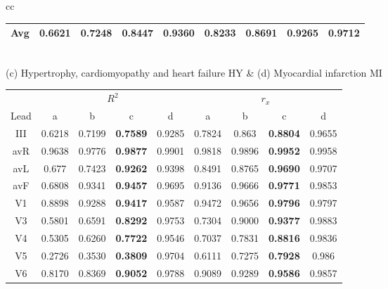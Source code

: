 \begin{table}[t!]
\begin{center}
\begin{tabular}{cc}
{\begin{footnotesize}
\begin{tabular}{|c|cccc|cccc|}
Avg & 0.6621 & 0.7248 & \textbf{0.8447} & 0.9360 & 0.8233  & 0.8691 & \textbf{0.9265} & 0.9712 \\

\hline
\end{tabular}
\end{footnotesize}
}
\\
(c) Hypertrophy, cardiomyopathy and heart failure HY & (d) Myocardial infarction MI \\
{
\begin{footnotesize}
\begin{tabular}{|c|cccc|cccc|}
\hline

\cline{2-9}
& \multicolumn{4}{c|}{$R^2$}
& \multicolumn{4}{c|}{$r_x$} \\
\cline{2-9}

Lead & a & b & c & d & a & b & c & d \\
\hline
III & 0.6218 & 0.7199 & \textbf{0.7589} & 0.9285 & 0.7824 & 0.863 & \textbf{0.8804} & 0.9655
  \\

avR & 0.9638 & 0.9776 & \textbf{0.9877} & 0.9901 & 0.9818 & 0.9896 & \textbf{0.9952} & 0.9958
  \\

avL & 0.677 & 0.7423 & \textbf{0.9262} & 0.9398 & 0.8491 & 0.8765 & \textbf{0.9690} & 0.9707
  \\

avF & 0.6808 & 0.9341 & \textbf{0.9457} & 0.9695 & 0.9136 & 0.9666 & \textbf{0.9771} & 0.9853
  \\

V1 & 0.8898 & 0.9288 & \textbf{0.9417} & 0.9587 & 0.9472 & 0.9656 & \textbf{0.9796} & 0.9797
  \\

V3 & 0.5801 & 0.6591 & \textbf{0.8292} & 0.9753 & 0.7304 & 0.9000 & \textbf{0.9377} & 0.9883
  \\

V4 & 0.5305 & 0.6260 & \textbf{0.7722} & 0.9546 & 0.7037 & 0.7831 & \textbf{0.8816} & 0.9836
  \\

V5 & 0.2726 & 0.3530 & \textbf{0.3809} & 0.9704 & 0.6111 & 0.7275 & \textbf{0.7928} & 0.986
  \\

V6 & 0.8170 & 0.8369 & \textbf{0.9052} & 0.9788 & 0.9089 & 0.9289 & \textbf{0.9586} & 0.9857
  \\


\end{tabular}
\end{footnotesize}}
\end{tabular}
\end{center}
\end{table}
